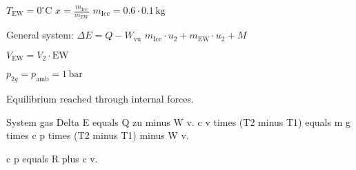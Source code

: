 \( T_{\text{EW}} = 0^\circ \text{C} \)  
\( x = \frac{m_{\text{Ice}}}{m_{\text{EW}}} \)  
\( m_{\text{Ice}} = 0.6 \cdot 0.1 \, \text{kg} \)  

General system:  
\( \Delta E = Q - W_{\text{vu}} \)  
\( m_{\text{Ice}} \cdot u_{2} + m_{\text{EW}} \cdot u_{2} + M \)  

\( V_{\text{EW}} = V_{2} \cdot \text{EW} \)  

\( p_{2g} = p_{\text{amb}} = 1 \, \text{bar} \)  

Equilibrium reached through internal forces.

System gas  
Delta E equals Q zu minus W v.  
c v times (T2 minus T1) equals m g times c p times (T2 minus T1) minus W v.  

c p equals R plus c v.